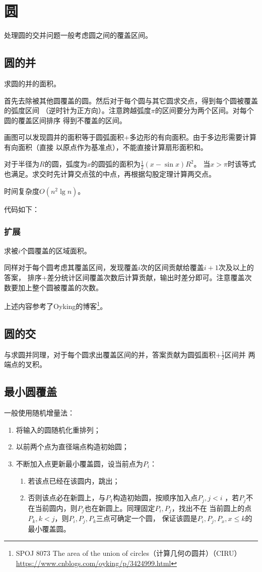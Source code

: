 \section{圆}
处理圆的交并问题一般考虑圆之间的覆盖区间。
\subsection{圆的并}
求圆的并的面积。

首先去除被其他圆覆盖的圆。然后对于每个圆与其它圆求交点，得到每个圆被覆盖的弧度区间
（逆时针为正方向）。注意跨越弧度$\pi$的区间要分为两个区间。对每个圆的覆盖区间排序
得到不覆盖的区间。

画图可以发现圆并的面积等于圆弧面积+多边形的有向面积。由于多边形需要计算有向面积（直接
以原点作为基准点），不能直接计算扇形面积和。

对于半径为$R$的圆，弧度为$x$的圆弧的面积为$\frac{1}{2}(x-\sin x)R^2$。
当$x> \pi$时该等式也满足。求交时先计算交点弦的中点，再根据勾股定理计算两交点。

时间复杂度$O(n^2 \lg n)$。

代码如下：


\subsubsection{扩展}
求被$i$个圆覆盖的区域面积。

同样对于每个圆考虑其覆盖区间，发现覆盖$i$次的区间贡献给覆盖$i+1$次及以上的答案，
排序+差分统计区间覆盖次数后计算贡献，输出时差分即可。注意覆盖次数要加上整个圆被覆盖的次数。



上述内容参考了Oyking的博客\footnote{
	SPOJ 8073 The area of the union of circles（计算几何の圆并）（CIRU）
	\url{https://www.cnblogs.com/oyking/p/3424999.html}
}。
\subsection{圆的交}
与求圆并同理，对于每个圆求出覆盖区间的并，答案贡献为圆弧面积+$\frac{1}{2}$区间并
两端点的叉积。
\subsection{最小圆覆盖}
一般使用随机增量法：
\begin{enumerate}
	\item 将输入的圆随机化重排列；
	\item 以前两个点为直径端点构造初始圆；
	\item 不断加入点更新最小覆盖圆，设当前点为$P_i$：
	\begin{enumerate}
		\item 若该点已经在该圆内，跳出；
		\item 否则该点必在新圆上，与$P_1$构造初始圆，按顺序加入点$P_j,j<i$
		，若$P_j$不在当前圆内，则$P_j$也在新圆上。同理固定$P_i,P_j$，找出不在
		当前圆上的点$P_k,k<j$，则$P_i,P_j,P_k$三点可确定一个圆，
		保证该圆是$P_i,P_j,P_x,x\leq k$的最小覆盖圆。
	\end{enumerate}
\end{enumerate}


